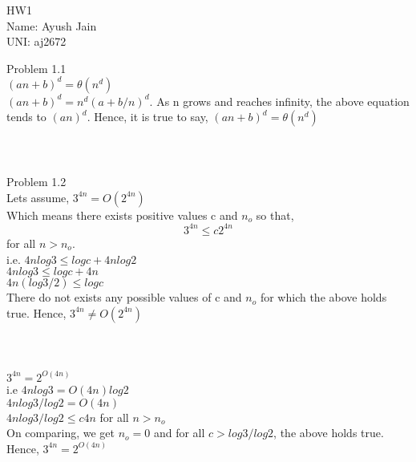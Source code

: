 \documentclass[10pt]{article}
\begin{document}
\vspace*{\fill}
\begin{Huge}
\begin{center}
HW1\\
Name: Ayush Jain\\
UNI: aj2672
\end{center}
\end{Huge}
\vspace*{\fill}
\newpage
Problem 1.1\\
$(an+b)^d = \theta(n^d)$ \\
$(an + b)^d = n^d(a + b/n)^d.$
As n grows and reaches infinity, the above equation tends to $(an)^d$. 
Hence, it is true to say, 
$(an+b)^d = \theta(n^d)$ 
\\\\\\\\
Problem 1.2\\
Lets assume, $3^{4n} = O(2^{4n})$\\
Which means there exists positive values c and $n_{o}$ so that, $$3^{4n} \leq c2^{4n}$$ for all $n > n_{o}$.\\
i.e. $4n log3 \leq logc + 4n log2$\\
$4nlog3 \leq logc + 4n$\\
$4n(log3/2) \leq logc$\\
There do not exists any possible values of c and $n_{o}$ for which the above holds true. Hence, $3^{4n} \neq O(2^{4n})$\\
\\
\\
\\

$3^{4n} = 2^{O(4n)}$\\
i.e $4nlog3 = O(4n)log2$\\
$4nlog3/log2 = O(4n)$\\
$4nlog3/log2 \leq c4n$ for all $n > n_{o}$\\
On comparing, we get $n_{o} = 0$ and for all $c > log3/log2$, the above holds true.\\
Hence, $3^{4n} = 2^{O(4n)}$\\
\end{document}
